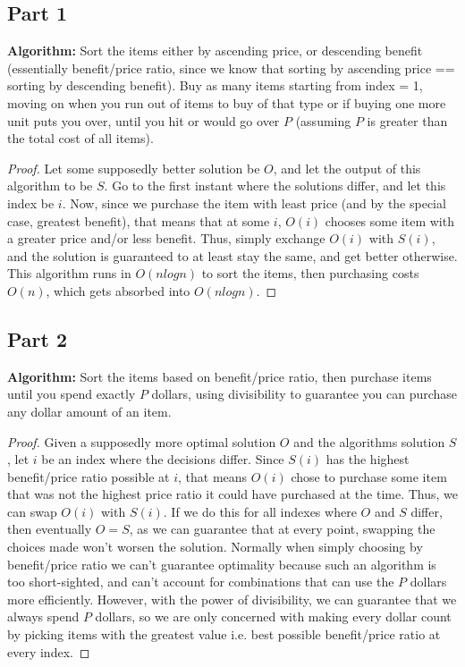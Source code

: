 \documentclass[11pt]{article}
\begin{document}
\subsection*{Part 1}
\textbf{Algorithm:} Sort the items either by ascending price, or descending benefit (essentially benefit/price ratio, since we know that sorting by ascending price == sorting by descending benefit). Buy as many items starting from index = 1, moving on when you run out of items to buy of that type or if buying one more unit puts you over, until you hit or would go over $P$ (assuming $P$ is greater than the total cost of all items).
\begin{proof}
Let some supposedly better solution be $O$, and let the output of this algorithm to be $S$. Go to the first instant where the solutions differ, and let this index be $i$. Now, since we purchase the item with least price (and by the special case, greatest benefit), that means that at some $i$, $O(i)$ chooses some item with a greater price and/or less benefit. Thus, simply exchange $O(i)$ with $S(i)$, and the solution is guaranteed to at least stay the same, and get better otherwise. This algorithm runs in $O(nlogn)$ to sort the items, then purchasing costs $O(n)$, which gets absorbed into $O(nlogn)$.
\end{proof}

\subsection*{Part 2}
\textbf{Algorithm:} Sort the items based on benefit/price ratio, then purchase items until you spend exactly $P$ dollars, using divisibility to guarantee you can purchase any dollar amount of an item.
\begin{proof}
Given a supposedly more optimal solution $O$ and the algorithms solution $S$, let $i$ be an index where the decisions differ. Since $S(i)$ has the highest benefit/price ratio possible at $i$, that means $O(i)$ chose to purchase some item that was not the highest price ratio it could have purchased at the time. Thus, we can swap $O(i)$ with $S(i)$. If we do this for all indexes where $O$ and $S$ differ, then eventually $O = S$, as we can guarantee that at every point, swapping the choices made won't worsen the solution. Normally when simply choosing by benefit/price ratio we can't guarantee optimality because such an algorithm is too short-sighted, and can't account for combinations that can use the $P$ dollars more efficiently. However, with the power of divisibility, we can guarantee that we always spend $P$ dollars, so we are only concerned with making every dollar count by picking items with the greatest value i.e. best possible benefit/price ratio at every index.
\end{proof}
\end{document}
